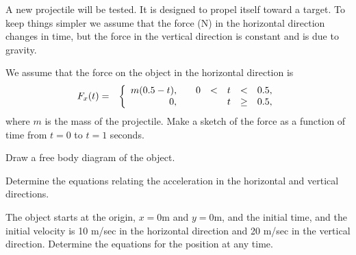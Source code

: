 \begin{problem}
\item A new projectile will be tested. It is designed to propel itself
  toward a target. To keep things simpler we assume that the force (N)
  in the horizontal direction changes in time, but the force in the
  vertical direction is constant and is due to gravity.
  \begin{subproblem}
    \item We assume that the force on the object in the horizontal
      direction is 
      \begin{eqnarray*}
        F_x(t) & = & \left\{
                     \begin{array}{r@{\hspace{2em}}rcccl}
                       m(0.5-t), & 0 & < & t & < & 0.5, \\
                       0,        &   &   & t & \geq & 0.5,
                     \end{array}
                     \right.
      \end{eqnarray*}
      where $m$ is the mass of the projectile.
      Make a sketch of the force as a function of time from $t=0$ to
      $t=1$ seconds. 
      \vfill

    \item Draw a free body diagram of the object.
      \vfill

    \item Determine the equations relating the acceleration in the
      horizontal and vertical directions.

      \vfill

      \clearpage

    \item The object starts at the origin, $x=0$m and $y=0$m, and the
      initial time, and the initial velocity is 10 m/sec in the
      horizontal direction and 20 m/sec in the vertical
      direction. Determine the equations for the position at any time.

      \vfill

  \end{subproblem}

  \clearpage


\end{problem}
